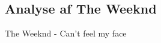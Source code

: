 \documentclass[12pt, letterpaper]{article}
\begin{document}
\begin{figure}[!h]
           \begin{floatrow}
       
           \end{floatrow}
\end{figure}

\newpage

\subsection{Analyse af The Weeknd}
The Weeknd - Can't feel my face
\end{document}
